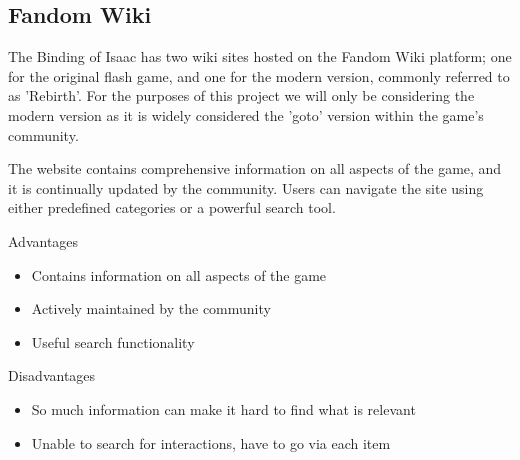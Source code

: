 \subsection*{Fandom Wiki}
The Binding of Isaac has two wiki sites hosted on the Fandom Wiki platform; one for the original flash 
game\cite{BindingIsaacWiki}, and one for the modern version, commonly referred to as 'Rebirth'\cite{BindingIsaacRebirth}.
For the purposes of this project we will only be considering the modern version as it is widely considered the 'goto' 
version within the game's community.\par The website contains comprehensive information on all aspects of the game, 
and it is continually updated by the community. Users can navigate the site using either predefined categories or a 
powerful search tool. \par
Advantages
\begin{itemize}
    \item Contains information on all aspects of the game
    \item Actively maintained by the community
    \item Useful search functionality
\end{itemize}
Disadvantages
\begin{itemize}
    \item So much information can make it hard to find what is relevant
    \item Unable to search for interactions, have to go via each item 
\end{itemize}

